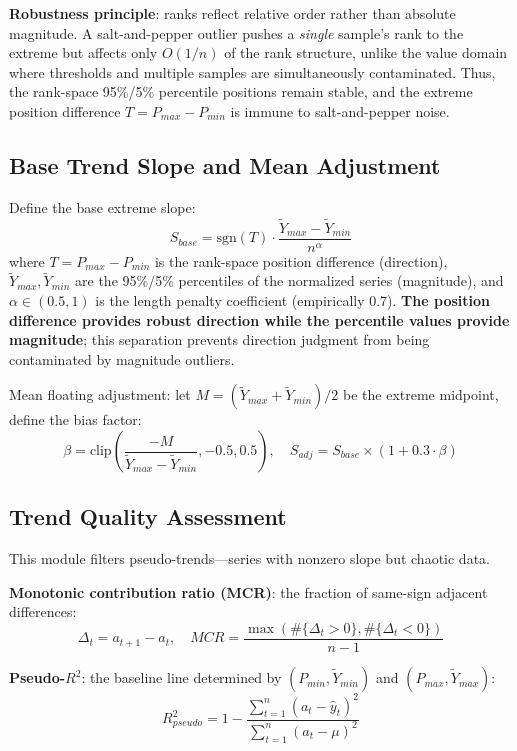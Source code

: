 \documentclass[11pt]{article}
\begin{document}
\textbf{Robustness principle}: ranks reflect relative order rather than absolute magnitude. A salt-and-pepper outlier pushes a \emph{single} sample's rank to the extreme but affects only $O(1/n)$ of the rank structure, unlike the value domain where thresholds and multiple samples are simultaneously contaminated. Thus, the rank-space 95\%/5\% percentile positions remain stable, and the extreme position difference $T = P_{max} - P_{min}$ is immune to salt-and-pepper noise.

\subsection{Base Trend Slope and Mean Adjustment}
Define the base extreme slope:
\begin{equation}
S_{base} = \text{sgn}(T) \cdot \frac{\tilde{Y}_{max} - \tilde{Y}_{min}}{n^{\alpha}}
\end{equation}
where $T = P_{max} - P_{min}$ is the rank-space position difference (direction), $\tilde{Y}_{max}, \tilde{Y}_{min}$ are the 95\%/5\% percentiles of the normalized series (magnitude), and $\alpha \in (0.5, 1)$ is the length penalty coefficient (empirically 0.7). \textbf{The position difference provides robust direction while the percentile values provide magnitude}; this separation prevents direction judgment from being contaminated by magnitude outliers.

Mean floating adjustment: let $M = (\tilde{Y}_{max} + \tilde{Y}_{min})/2$ be the extreme midpoint, define the bias factor:
\begin{equation}
\beta = \text{clip}\left(\frac{-M}{\tilde{Y}_{max} - \tilde{Y}_{min}}, -0.5, 0.5\right), \quad S_{adj} = S_{base} \times (1 + 0.3 \cdot \beta)
\end{equation}

\subsection{Trend Quality Assessment}
This module filters pseudo-trends---series with nonzero slope but chaotic data.

\textbf{Monotonic contribution ratio (MCR)}: the fraction of same-sign adjacent differences:
\begin{equation}
\Delta_t = a_{t+1} - a_t, \quad MCR = \frac{\max(\#\{\Delta_t > 0\}, \#\{\Delta_t < 0\})}{n-1}
\end{equation}

\textbf{Pseudo-$R^2$}: the baseline line determined by $(P_{min}, \tilde{Y}_{min})$ and $(P_{max}, \tilde{Y}_{max})$:
\begin{equation}
R^2_{pseudo} = 1 - \frac{\sum_{t=1}^{n} (a_t - \hat{y}_t)^2}{\sum_{t=1}^{n} (a_t - \mu)^2}
\end{equation}
\end{document}
